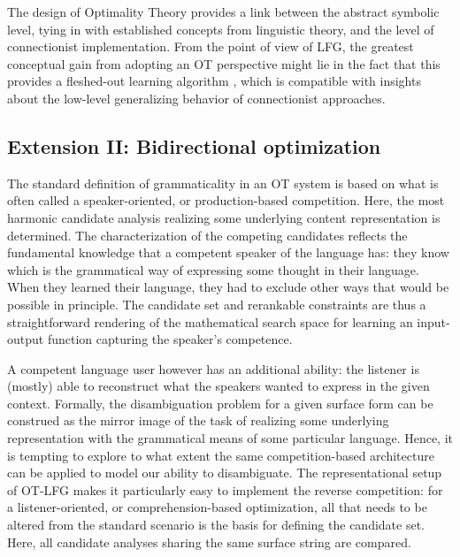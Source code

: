 \documentclass[output=paper,hidelinks]{langscibook}
\begin{document}
The design of Optimality Theory provides a link between the abstract symbolic level, tying in with established concepts from linguistic theory, and the level of connectionist implementation. From the point of view of LFG, the greatest conceptual gain from adopting an OT perspective might lie in the fact that this provides a fleshed-out learning algorithm \citep{TesarSmolensky1998}, which is compatible with insights about the low-level generalizing behavior of connectionist approaches.


\subsection{Extension II: Bidirectional optimization}
\label{sec:OT:biOT}

The standard definition of grammaticality in an OT system is based on what is often called a speaker-oriented, or production-based competition. Here, the most harmonic candidate analysis realizing some underlying content representation is determined.
The characterization of the competing candidates reflects the fundamental knowledge that a competent speaker of the language has: they know which is the grammatical way of expressing some thought in their language. When they learned their language, they had to exclude other ways that would be possible in principle. The candidate set and rerankable constraints are thus a straightforward rendering of the mathematical search space for learning an input-output function capturing the speaker's competence.

A competent language user however has an additional ability: the listener is (mostly) able to reconstruct what the speakers wanted to express in the given context.
Formally, the disambiguation problem for a given surface form can be construed as the mirror image of the task of realizing some underlying representation with the grammatical means of some particular language. Hence, it is tempting to explore to what extent the same competition-based architecture can be applied to model our ability to disambiguate.
The representational setup of OT-LFG makes it particularly easy to implement the reverse competition: for a listener-oriented, or comprehension-based optimization, all that needs to be altered from the standard scenario is the basis for defining the candidate set. Here, all candidate analyses sharing the same surface string are compared.

\end{document}
